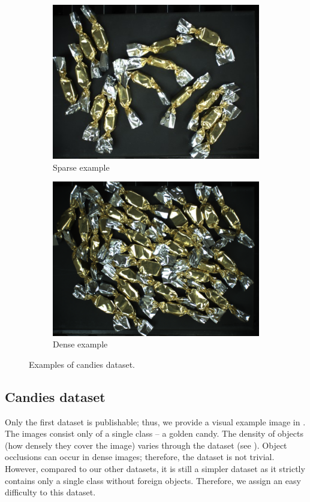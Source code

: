 \begin{figure}[H]

	\begin{subfigure}[c]{0.5\textwidth}
		\centering
		\includegraphics[width=0.9\linewidth]{Sources/Figures/sparse.jpg}
		\caption{Sparse example}

	\end{subfigure}
	\begin{subfigure}[c]{0.5\textwidth}
		\centering
		\includegraphics[width=0.9\linewidth]{Sources/Figures/dense.png}
		\caption{Dense example}

	\end{subfigure}

	\caption{Examples of candies dataset.}
	\label{fig:candies}
\end{figure}

\subsection*{Candies dataset}
Only the first dataset is publishable; thus, we provide a
visual example image in . The images consist only of a
single class -- a golden candy. The density of objects (how densely they cover
the image) varies through the dataset (see ). Object
occlusions can occur in dense images; therefore, the dataset is not trivial.
However, compared to our other datasets, it is still a simpler dataset as it
strictly contains only a single class without foreign objects. Therefore, we
assign an easy difficulty to this dataset.

